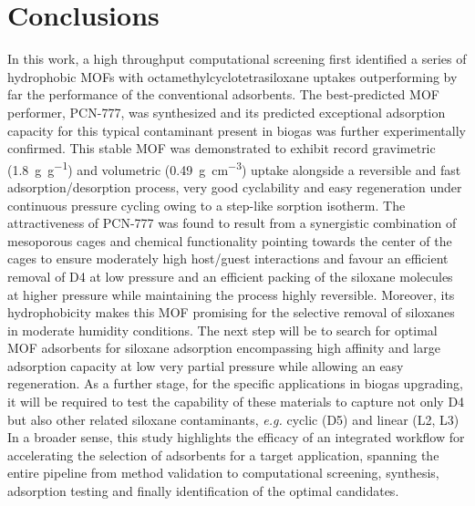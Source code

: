 \section{Conclusions}\label{conclusions}

In this work, a high throughput computational screening first identified a
series of hydrophobic MOFs with octamethylcyclotetrasiloxane uptakes
outperforming by far the performance of the conventional adsorbents. The
best-predicted MOF performer, PCN-777, was synthesized and its predicted
exceptional adsorption capacity for this typical contaminant present in biogas
was further experimentally confirmed. This stable MOF was demonstrated to
exhibit record gravimetric (\SI{1.8}{\gram\per\gram}) and volumetric
(\SI{0.49}{\gram\per\centi\metre\cubed}) uptake alongside a reversible and fast
adsorption/desorption process, very good cyclability and easy regeneration under
continuous pressure cycling owing to a step-like sorption isotherm. The
attractiveness of PCN-777 was found to result from a synergistic combination of
mesoporous cages and chemical functionality pointing towards the center of the
cages to ensure moderately high host/guest interactions and favour an efficient
removal of D4 at low pressure and an efficient packing of the siloxane molecules
at higher pressure while maintaining the process highly reversible. Moreover,
its hydrophobicity makes this MOF promising for the selective removal of
siloxanes in moderate humidity conditions. The next step will be to search for
optimal MOF adsorbents for siloxane adsorption encompassing high affinity and
large adsorption capacity at low very partial pressure while allowing an easy
regeneration. As a further stage, for the specific applications in biogas
upgrading, it will be required to test the capability of these materials to
capture not only D4 but also other related siloxane contaminants, \textit{e.g.}
cyclic (D5) and linear (L2, L3) In a broader sense, this study highlights the
efficacy of an integrated workflow for accelerating the selection of adsorbents
for a target application, spanning the entire pipeline from method validation to
computational screening, synthesis, adsorption testing and finally
identification of the optimal candidates.
